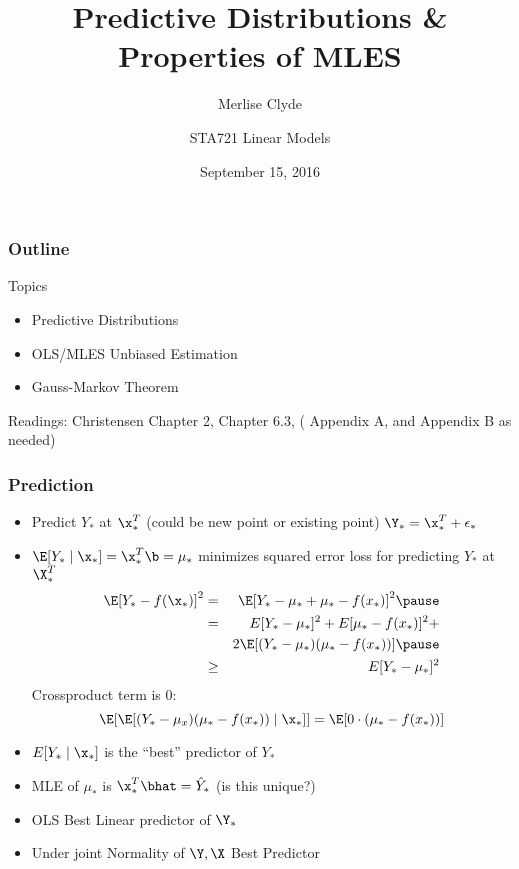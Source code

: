 \documentclass[handout]{beamer}
\title{Predictive Distributions \& Properties of MLES}
\subtitle{Merlise Clyde}
\author{STA721 Linear Models}
\institute{Duke University}
\date{September 15, 2016}
\begin{document}
\maketitle

\begin{frame}\frametitle{Outline}
Topics
  \begin{itemize}
  \item Predictive Distributions
  \item OLS/MLES Unbiased Estimation
  \item Gauss-Markov Theorem
  \end{itemize}


Readings: Christensen Chapter 2,  Chapter 6.3, ( Appendix A, and
Appendix B as needed)
\end{frame}

\begin{frame} \frametitle{Prediction}

  \begin{itemize}
  \item Predict $Y_*$ at $\x_*^T$   (could be new point or existing
    point) $\Y_* = \x_*^T + \epsilon_*$ \pause
 \item $\E[Y_* \mid \x_*] = \x_*^{T} \b = \mu_*$ minimizes squared
   error loss for predicting $Y_*$ at $\X_*^T$ \pause
   \begin{eqnarray*}
     \E[Y_* - f(\x_*)]^2 & = & \E[Y_* - \mu_* + \mu_* - f(x_*)]^2
                               \pause \\
 & = & E[Y_* - \mu_*]^2 + E[\mu_* - f(x_*)]^2 + \\  &  & 2\E[( Y_* -
       \mu_*)(\mu_* - f(x_*))] \pause \\
 & \geq & E[Y_* - \mu_*]^2   \end{eqnarray*} \pause
Crossproduct term is 0:  
$$\E[\E[( Y_* -
       \mu_x)(\mu_* - f(x_*))\mid \x_*]] = \E[0 \cdot (\mu_* -
       f(x_*))]$$
\item $E[Y_* \mid \x_*]$ is the ``best'' predictor of $Y_*$
\item MLE of $\mu_*$ is $\x_*^{T} \bhat  = \hat{Y}_*$ (is this
  unique?) \pause
\item OLS Best Linear predictor of $\Y_*$
\item Under joint Normality of $\Y, \X$  Best Predictor
  \end{itemize}
\end{frame}
\end{document}
